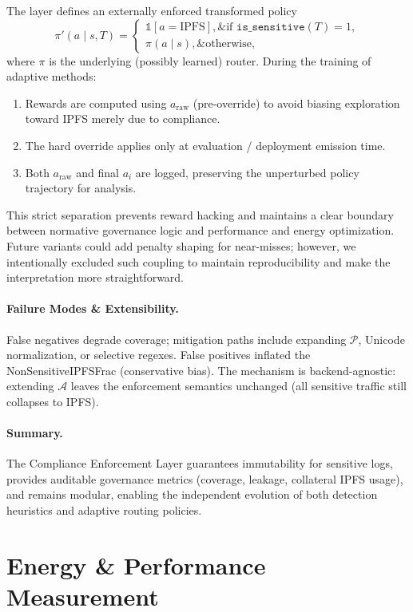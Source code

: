 The layer defines an externally enforced transformed policy
\[
\pi'(a \mid s, T) =
\begin{cases}
\mathbb{1}[a = \text{IPFS}],\& \text{if } \texttt{is\_sensitive}(T)=1,\\
\pi(a \mid s),\& \text{otherwise,}
\end{cases}
\]
where $\pi$ is the underlying (possibly learned) router. During the training of adaptive methods:
\begin{enumerate}
  \item Rewards are computed using $a_{\text{raw}}$ (pre-override) to avoid biasing exploration toward IPFS merely due to compliance.
  \item The hard override applies only at evaluation / deployment emission time.
  \item Both $a_{\text{raw}}$ and final $a_i$ are logged, preserving the unperturbed policy trajectory for analysis.
\end{enumerate}
This strict separation prevents reward hacking and maintains a clear boundary between normative governance logic and performance and energy optimization. Future variants could add penalty shaping for near-misses; however, we intentionally excluded such coupling to maintain reproducibility and make the interpretation more straightforward.

\paragraph{Failure Modes \& Extensibility.}
False negatives degrade coverage; mitigation paths include expanding $\mathcal{P}$, Unicode normalization, or selective regexes. False positives inflated the NonSensitiveIPFSFrac (conservative bias). The mechanism is backend-agnostic: extending $\mathcal{A}$ leaves the enforcement semantics unchanged (all sensitive traffic still collapses to IPFS).

\paragraph{Summary.}
The Compliance Enforcement Layer guarantees immutability for sensitive logs, provides auditable governance metrics (coverage, leakage, collateral IPFS usage), and remains modular, enabling the independent evolution of both detection heuristics and adaptive routing policies.

\section{Energy \& Performance Measurement}
\label{s:energy-measurement}

